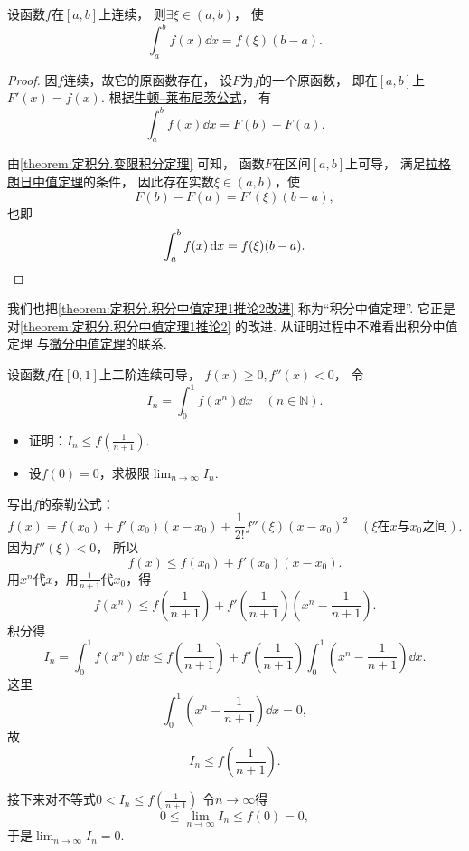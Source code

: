 \begin{proposition}\label{theorem:定积分.积分中值定理1推论2改进}
设函数\(f\)在\([a,b]\)上连续，
则\(\exists\xi\in(a,b)\)，
使\[
	\int_a^b f(x) \dd{x} = f(\xi) (b-a).
\]
\begin{proof}
因\(f\)连续，故它的原函数存在，
设\(F\)为\(f\)的一个原函数，
即在\([a,b]\)上\(F'(x) = f(x)\).
根据\hyperref[equation:定积分.牛顿--莱布尼茨公式]{牛顿--莱布尼茨公式}，
有\[
	\int_a^b f(x) \dd{x}
	= F(b) - F(a).
\]

由\cref{theorem:定积分.变限积分定理} 可知，
函数\(F\)在区间\([a,b]\)上可导，
满足\hyperref[theorem:微分中值定理.拉格朗日中值定理]{拉格朗日中值定理}的条件，
因此存在实数\(\xi\in(a,b)\)，使\[
	F(b) - F(a) = F'(\xi) (b-a),
\]
也即\[
	\int_a^b f(x) \dd{x} = f(\xi) (b-a).
	\qedhere
\]
\end{proof}
\end{proposition}
\begin{remark}
我们也把\cref{theorem:定积分.积分中值定理1推论2改进} 称为“积分中值定理”.
它正是对\cref{theorem:定积分.积分中值定理1推论2} 的改进.
从证明过程中不难看出积分中值定理
与\hyperref[theorem:微分中值定理.拉格朗日中值定理]{微分中值定理}的联系.
\end{remark}

\begin{example}
设函数\(f\)在\([0,1]\)上二阶连续可导，
\(f(x)\geq0,
f''(x)<0\)，
令\[
	I_n = \int_0^1 f(x^n) \dd{x}
	\quad(n\in\mathbb{N}).
\]
\begin{itemize}
	\item 证明：\(I_n \leq f\left( \frac1{n+1} \right)\).
	\item 设\(f(0) = 0\)，求极限\(\lim_{n\to\infty} I_n\).
\end{itemize}
\begin{solution}
写出\(f\)的泰勒公式：\[
	f(x) = f(x_0) + f'(x_0) (x-x_0) + \frac1{2!} f''(\xi) (x-x_0)^2
	\quad(\text{$\xi$在$x$与$x_0$之间}).
\]
因为\(f''(\xi)<0\)，
所以\[
	f(x) \leq f(x_0) + f'(x_0) (x-x_0).
\]
用\(x^n\)代\(x\)，用\(\frac1{n+1}\)代\(x_0\)，得\[
	f(x^n)
	\leq
	f\left(\frac1{n+1}\right) + f'\left(\frac1{n+1}\right) \left(x^n-\frac1{n+1}\right).
\]
积分得\[
	I_n = \int_0^1 f(x^n) \dd{x}
	\leq f\left(\frac1{n+1}\right)
	+ f'\left(\frac1{n+1}\right) \int_0^1 \left(x^n-\frac1{n+1}\right) \dd{x}.
\]
这里\[
	\int_0^1 \left(x^n-\frac1{n+1}\right) \dd{x} = 0,
\]
故\[
	I_n \leq f\left(\frac1{n+1}\right).
\]

接下来对不等式\(0 < I_n \leq f\left(\frac1{n+1}\right)\)
令\(n\to\infty\)得\[
	0 \leq \lim_{n\to\infty} I_n \leq f(0) = 0,
\]
于是\(\lim_{n\to\infty} I_n = 0\).
\end{solution}
\end{example}

